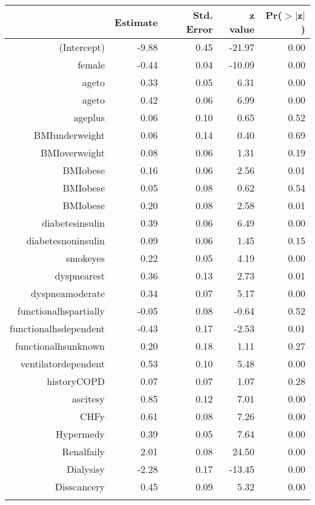 \bigskip\bigskip
\centering
\begin{tabular}{rrrrr}
  \hline
 & Estimate & Std. Error & z value & Pr($>$$|$z$|$) \\ 
  \hline
(Intercept) & -9.88 & 0.45 & -21.97 & 0.00 \\ 
  female & -0.44 & 0.04 & -10.09 & 0.00 \\ 
  age\-65\-to\-74 & 0.33 & 0.05 & 6.31 & 0.00 \\ 
  age\-75\-to\-84 & 0.42 & 0.06 & 6.99 & 0.00 \\ 
  age\-85\-plus & 0.06 & 0.10 & 0.65 & 0.52 \\ 
  BMI\-underweight & 0.06 & 0.14 & 0.40 & 0.69 \\ 
  BMI\-overweight & 0.08 & 0.06 & 1.31 & 0.19 \\ 
  BMI\-obese\-1 & 0.16 & 0.06 & 2.56 & 0.01 \\ 
  BMI\-obese\-2 & 0.05 & 0.08 & 0.62 & 0.54 \\ 
  BMI\-obese\-3 & 0.20 & 0.08 & 2.58 & 0.01 \\ 
  diabetes\-insulin & 0.39 & 0.06 & 6.49 & 0.00 \\ 
  diabetes\-noninsulin & 0.09 & 0.06 & 1.45 & 0.15 \\ 
  smoke\-yes & 0.22 & 0.05 & 4.19 & 0.00 \\ 
  dyspnea\-rest & 0.36 & 0.13 & 2.73 & 0.01 \\ 
  dyspnea\-moderate & 0.34 & 0.07 & 5.17 & 0.00 \\ 
  functional\-hs\-partially & -0.05 & 0.08 & -0.64 & 0.52 \\ 
  functional\-hs\-dependent & -0.43 & 0.17 & -2.53 & 0.01 \\ 
  functional\-hs\-unknown & 0.20 & 0.18 & 1.11 & 0.27 \\ 
  ventilator\-dependent & 0.53 & 0.10 & 5.48 & 0.00 \\ 
  history\-COPD & 0.07 & 0.07 & 1.07 & 0.28 \\ 
  ascites\-y & 0.85 & 0.12 & 7.01 & 0.00 \\ 
  CHF\-y & 0.61 & 0.08 & 7.26 & 0.00 \\ 
  Hyper\-med\-y & 0.39 & 0.05 & 7.64 & 0.00 \\ 
  Renal\-fail\-y & 2.01 & 0.08 & 24.50 & 0.00 \\ 
  Dialysis\-y & -2.28 & 0.17 & -13.45 & 0.00 \\ 
  Diss\-cancer\-y & 0.45 & 0.09 & 5.32 & 0.00 \\ 
$$
\end{tabular}

